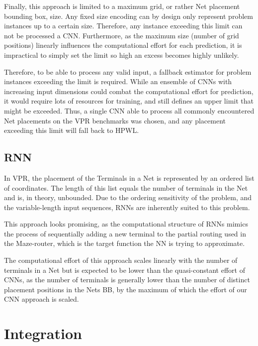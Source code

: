 Finally, this approach is limited to a maximum grid, or rather Net placement bounding box, size. Any fixed size encoding can by design only represent problem instances up to a certain size. Therefore, any instance exceeding this limit can not be processed a \gls{CNN}. Furthermore, as the maximum size (number of grid positions) linearly influences the computational effort for each prediction, it is impractical to simply set the limit so high an excess becomes highly unlikely.

Therefore, to be able to process any valid input, a fallback estimator for problem instances exceeding the limit is required. While an ensemble of \glspl{CNN} with increasing input dimensions could combat the computational effort for prediction, it would require lots of resources for training, and still defines an upper limit that might be exceeded. Thus, a single \gls{CNN} able to process all commonly encountered Net placements on the \gls{VPR} benchmarks was chosen, and any placement exceeding this limit will fall back to \gls{HPWL}.

\subsection{\gls{RNN}}

In \gls{VPR}, the placement of the Terminals in a Net is represented by an ordered list of coordinates. The length of this list equals the number of terminals in the Net and is, in theory, unbounded. Due to the ordering sensitivity of the problem, and the variable-length input sequences, \glspl{RNN} are inherently suited to this problem.

This approach looks promising, as the computational structure of \glspl{RNN} mimics the process of sequentially adding a new terminal to the partial routing used in the Maze-router, which is the target function the \gls{NN} is trying to approximate.

The computational effort of this approach scales linearly with the number of terminals in a Net but is expected to be lower than the quasi-constant effort of \glspl{CNN}, as the number of terminals is generally lower than the number of distinct placement positions in the Nets \gls{BB}, by the maximum of which the effort of our CNN approach is scaled.

\section{Integration}

